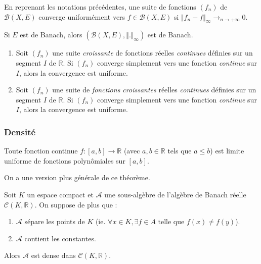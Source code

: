   \begin{proposition}
    En reprenant les notations précédentes, une suite de fonctions $(f_n)$ de $\mathcal{B}(X,E)$ converge uniformément vers $f \in \mathcal{B}(X,E)$ si $\Vert f_n - f \Vert_\infty \longrightarrow_{n \rightarrow +\infty} 0$.
  \end{proposition}

  \begin{proposition}
    Si $E$ est de Banach, alors $(\mathcal{B}(X,E), \Vert . \Vert_\infty)$ est de Banach.
  \end{proposition}


  \begin{theorem}
    \begin{enumerate}[label=(\roman*)]
      \item Soit $(f_n)$ une suite \textit{croissante} de fonctions réelles \textit{continues} définies sur un segment $I$ de $\mathbb{R}$. Si $(f_n)$ converge simplement vers une fonction \textit{continue} sur $I$, alors la convergence est uniforme.
      \item Soit $(f_n)$ une suite de \textit{fonctions croissantes} réelles \textit{continues} définies sur un segment $I$ de $\mathbb{R}$. Si $(f_n)$ converge simplement vers une fonction \textit{continue} sur $I$, alors la convergence est uniforme.
    \end{enumerate}
  \end{theorem}

  \subsubsection{Densité}


  \begin{theorem}[Weierstrass]
    Toute fonction continue $f : [a,b] \rightarrow \mathbb{R}$ (avec $a, b \in \mathbb{R}$ tels que $a \leq b$) est limite uniforme de fonctions polynômiales sur $[a, b]$.
  \end{theorem}

  On a une version plus générale de ce théorème.


  \begin{theorem}
    Soit $K$ un espace compact et $\mathcal{A}$ une sous-algèbre de l'algèbre de Banach réelle $\mathcal{C}(K, \mathbb{R})$. On suppose de plus que :
    \begin{enumerate}[label=(\roman*)]
      \item $\mathcal{A}$ sépare les points de $K$ (ie. $\forall x \in K, \exists f \in A \text{ telle que } f(x) \neq f(y)$).
      \item $\mathcal{A}$ contient les constantes.
    \end{enumerate}
    Alors $\mathcal{A}$ est dense dans $\mathcal{C}(K, \mathbb{R})$.
  \end{theorem}

